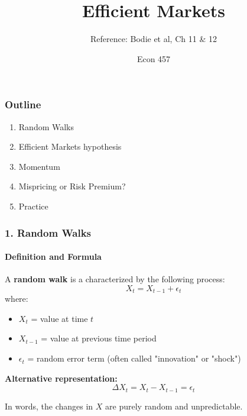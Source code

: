 \documentclass{beamer}
\title{Efficient Markets}
\subtitle{Reference: Bodie et al, Ch 11 \& 12}
\author{Econ 457}
\date{\week}
\begin{document}
\frame{\titlepage}

\begin{frame}
    \frametitle{Outline}

    \begin{enumerate}
        \item Random Walks
        \item Efficient Markets hypothesis
        \item Momentum
        \item Mispricing or Risk Premium?
        \item Practice
    \end{enumerate}

\end{frame}

\begin{foundframe}[t]
    \frametitle{1. Random Walks}
    \framesubtitle{Definition and Formula}

    A \textbf{random walk} is a characterized by the following process:
    $$X_t = X_{t-1} + \epsilon_t$$
    where:
    \begin{itemize}
        \item $X_t$ = value at time $t$
        \item $X_{t-1}$ = value at previous time period
        \item $\epsilon_t$ = random error term (often called "innovation" or "shock")
    \end{itemize}
    \vspace{1em}

    \textbf{Alternative representation:}
    $$\Delta X_t = X_t - X_{t-1} = \epsilon_t$$
    
    In words, the changes in $X$ are purely random and unpredictable.

\end{foundframe}
\end{document}
